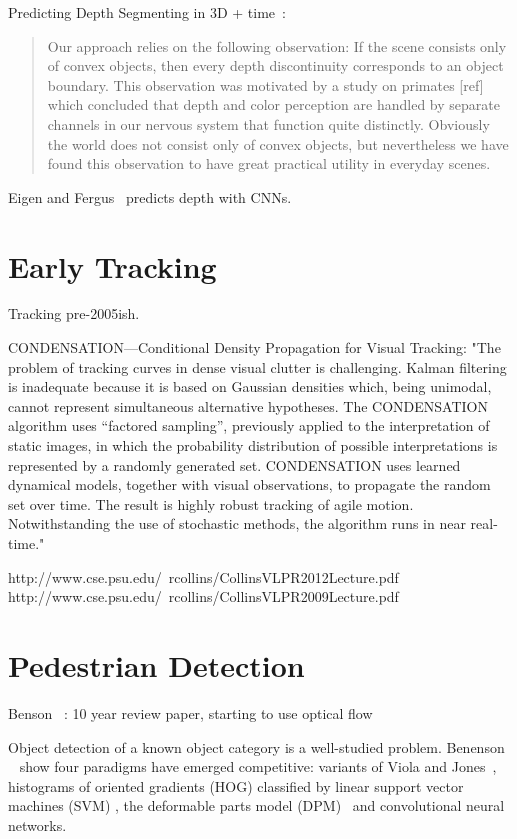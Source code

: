 Predicting Depth
Segmenting in 3D + time~\cite{hickson2014efficient}:
\blockquote{Our approach relies on the following observation: If the
scene consists only of convex objects, then every depth discontinuity
corresponds to an object boundary. This observation
was motivated by a study on primates [ref] which concluded
that depth and color perception are handled by separate
channels in our nervous system that function quite distinctly.
Obviously the world does not consist only of convex
objects, but nevertheless we have found this observation to
have great practical utility in everyday scenes. }

Eigen and Fergus~\cite{eigen2014predicting} predicts depth with CNNs.

\section{Early Tracking}
Tracking pre-2005ish.

CONDENSATION—Conditional Density Propagation for Visual Tracking: "The problem of tracking curves in dense visual clutter is challenging. Kalman filtering is inadequate because it is based on Gaussian densities which, being unimodal, cannot represent simultaneous alternative hypotheses. The CONDENSATION algorithm uses ``factored sampling'', previously applied to the interpretation of static images, in which the probability distribution of possible interpretations is represented by a randomly generated set. CONDENSATION uses learned dynamical models, together with visual observations, to propagate the random set over time. The result is highly robust tracking of agile motion. Notwithstanding the use of stochastic methods, the algorithm runs in near real-time."

http://www.cse.psu.edu/~rcollins/CollinsVLPR2012Lecture.pdf
http://www.cse.psu.edu/~rcollins/CollinsVLPR2009Lecture.pdf

\section{Pedestrian Detection}

Benson \etal~\cite{benenson2014ten}: 10 year review paper, starting to use optical flow

Object detection of a known object category is a well-studied problem. 
Benenson \etal~\cite{benenson2014ten} show four paradigms have emerged competitive: variants of Viola and Jones~\cite{viola2005detecting}, histograms of oriented gradients (HOG) classified by linear support vector machines (SVM) \cite{dalal2005histograms}, the deformable parts model (DPM)~\cite{felzenszwalb2010object} and convolutional neural networks.

